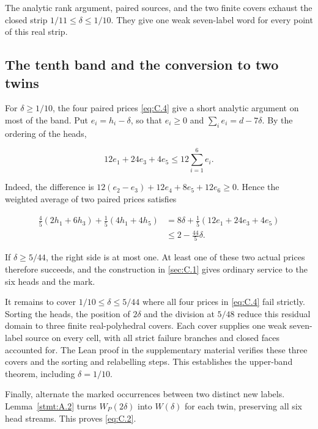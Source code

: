 \documentclass[11pt,a4paper]{article}
\begin{document}
The analytic rank argument, paired sources, and the two finite covers exhaust the closed strip \(1/11\le\delta\le1/10\). They give one weak seven-label word for every point of this real strip.

\subsection{The tenth band and the conversion to two twins}\label{sec:C.2}

For \(\delta\ge1/10\), the four paired prices \eqref{eq:C.4} give a short analytic argument on most of the band. Put \(e_i=h_i-\delta\), so that \(e_i\ge0\) and \(\sum_i e_i=d-7\delta\). By the ordering of the heads,

\begin{equation}
12e_1+24e_3+4e_5\le12\sum_{i=1}^{6}e_i.
\tag{C.7}\label{eq:C.7}
\end{equation}

Indeed, the difference is \(12(e_2-e_3)+12e_4+8e_5+12e_6\ge0\). Hence the weighted average of two paired prices satisfies

\begin{equation}
\begin{aligned}
\frac45(2h_1+6h_3)+\frac15(4h_1+4h_5)
&=8\delta+\frac15(12e_1+24e_3+4e_5)\\
&\le2-\frac{44}{5}\delta.
\end{aligned}
\tag{C.8}\label{eq:C.8}
\end{equation}

If \(\delta\ge5/44\), the right side is at most one. At least one of these two actual prices therefore succeeds, and the construction in \ref{sec:C.1} gives ordinary service to the six heads and the mark.

It remains to cover \(1/10\le\delta\le5/44\) where all four prices in \eqref{eq:C.4} fail strictly. Sorting the heads, the position of \(2\delta\) and the division at \(5/48\) reduce this residual domain to three finite real-polyhedral covers. Each cover supplies one weak seven-label source on every cell, with all strict failure branches and closed faces accounted for. The Lean proof in the supplementary material verifies these three covers and the sorting and relabelling steps. This establishes the upper-band theorem, including \(\delta=1/10\).

Finally, alternate the marked occurrences between two distinct new labels. Lemma~\ref{stmt:A.2} turns \(W_P(2\delta)\) into \(W(\delta)\) for each twin, preserving all six head streams. This proves \eqref{eq:C.2}.
\end{document}
